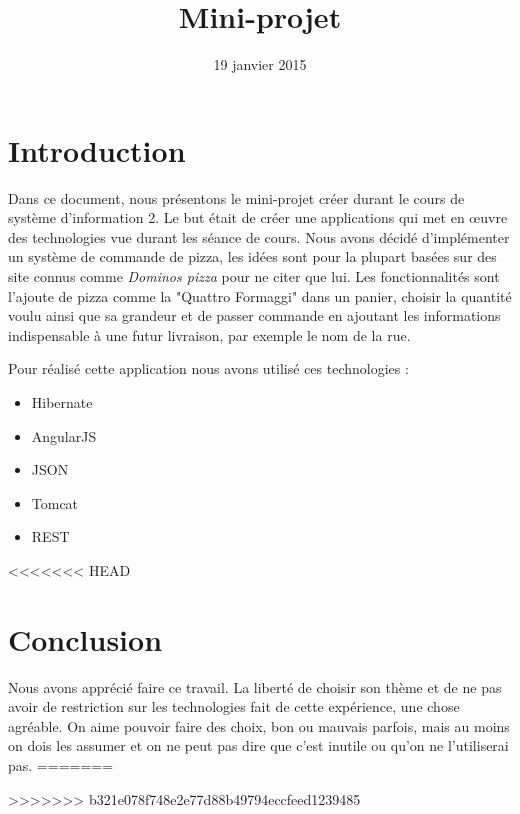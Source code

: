 \documentclass[twoside]{eiaArticle}
\title{Mini-projet }
\date{19 janvier 2015}
\author{ \eiaauthors }
\begin{document}
\eiafullpagetitle{} %

\cleardoublepage %

\tableofcontents

\cleardoublepage

\section*{Introduction}
\setcounter{page}{1}
Dans ce document, nous présentons le mini-projet créer durant le cours de système d'information 2. Le but était de créer une applications qui met en œuvre des technologies vue durant les séance de cours.
Nous avons décidé d'implémenter un système de commande de pizza, les idées sont pour la plupart basées sur des site connus comme \textit{Dominos pizza} pour ne citer que lui. Les fonctionnalités sont l'ajoute de pizza comme la "Quattro Formaggi" dans un panier, choisir la quantité voulu ainsi que sa grandeur et de passer commande en ajoutant les informations indispensable à une futur livraison, par exemple le nom de la rue.

Pour réalisé cette application nous avons utilisé ces technologies :
\begin{itemize}
\item Hibernate
\item AngularJS
\item JSON
\item Tomcat
\item REST
\end{itemize}















<<<<<<< HEAD
\section*{Conclusion}
Nous avons apprécié faire ce travail. La liberté de choisir son thème et de ne pas avoir de restriction sur les technologies fait de cette expérience, une chose agréable. On aime pouvoir faire des choix, bon ou mauvais parfois, mais au moins on dois les assumer et on ne peut pas dire que c'est inutile ou qu'on ne l'utiliserai pas.
=======

>>>>>>> b321e078f748e2e77d88b49794eccfeed1239485
\end{document}
